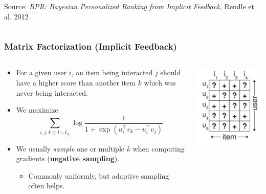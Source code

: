 \documentclass[11pt,aspectratio=169]{beamer}
\begin{document}
\begin{frame}
\begin{columns}
\begin{column}{0.5\textwidth}
\begin{center}
					{\tiny Source: \textit{BPR: Bayesian Personalized Ranking from Implicit Feedback}, Rendle et al. 2012}
				\end{center}
			\end{column}
		\end{columns}
	\end{frame}

	\begin{frame}
		\frametitle{Matrix Factorization (Implicit Feedback)}
		\begin{columns}
			\begin{column}{0.6\textwidth}
				\begin{itemize}
					\item<1-> For a given user $i$, an item being interacted $j$ should have a higher score than another item $k$ which was never being interacted.
					\item<2-> We maximize
					$$
					\sum_{i,j,k\in I \backslash I_{u_i}}
					\log \dfrac{1}{1 + \exp\left(u_i^\top v_k - u_i^\top v_j\right)}
					$$
					\item<3-> We usually \emph{sample} one or multiple $k$ when computing gradients (\textbf{negative sampling}).
					\begin{itemize}
						\item Commonly uniformly, but adaptive sampling often helps.
					\end{itemize}
				\end{itemize}
			\end{column}
			\begin{column}{0.4\textwidth}
				\begin{center}
					\centering
					\includegraphics[width=\textwidth]{images/implicit.png}
					

\end{center}
\end{column}
\end{columns}
\end{frame}
\end{document}

